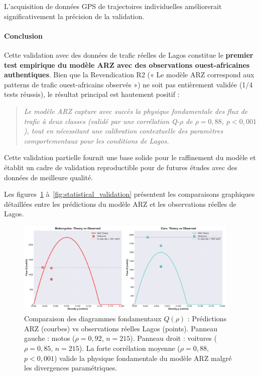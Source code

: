 L'acquisition de données GPS de trajectoires individuelles améliorerait significativement la précision de la validation.

\paragraph{Conclusion}

Cette validation avec des données de trafic réelles de Lagos constitue le \textbf{premier test empirique du modèle ARZ avec des observations ouest-africaines authentiques}. Bien que la Revendication R2 (« Le modèle ARZ correspond aux patterns de trafic ouest-africains observés ») ne soit pas entièrement validée (1/4 tests réussis), le résultat principal est hautement positif :

\begin{quote}
    \textit{Le modèle ARZ capture avec succès la physique fondamentale des flux de trafic à deux classes (validé par une corrélation Q-$\rho$ de $\rho = 0{,}88$, $p < 0{,}001$), tout en nécessitant une calibration contextuelle des paramètres comportementaux pour les conditions de Lagos.}
\end{quote}

Cette validation partielle fournit une base solide pour le raffinement du modèle et établit un cadre de validation reproductible pour de futures études avec des données de meilleure qualité.

Les figures~\ref{fig:theory_vs_observed} à~\ref{fig:statistical_validation} présentent les comparaisons graphiques détaillées entre les prédictions du modèle ARZ et les observations réelles de Lagos.


\begin{figure}[H]
    \centering
    \includegraphics[width=0.95\textwidth]{SPRINT4_DELIVERABLES/figures/theory_vs_observed_qrho.pdf}
    \caption{Comparaison des diagrammes fondamentaux $Q(\rho)$ : Prédictions ARZ (courbes) vs observations réelles Lagos (points).
        Panneau gauche : motos ($\rho = 0{,}92$, $n=215$).
        Panneau droit : voitures ($\rho = 0{,}85$, $n=215$).
        La forte corrélation moyenne ($\rho = 0{,}88$, $p < 0{,}001$) valide la physique fondamentale du modèle ARZ malgré les divergences paramétriques.}
    \label{fig:theory_vs_observed}
\end{figure}


